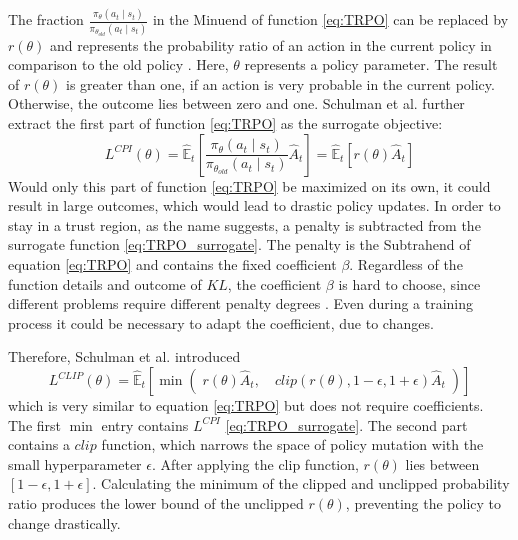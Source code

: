 The fraction $\frac{\pi_{\theta}(a_{t} \mid s_{t})}{\pi_{\theta_{old}}(a_{t} \mid s_{t})}$ in the Minuend of function \eqref{eq:TRPO} can be replaced by $r(\theta)$
and represents the probability ratio of an action in the current policy in comparison to the old policy \cite{scwo17}. Here, $\theta$ represents a policy parameter. The result of $r(\theta)$ is greater than one, if an action is very probable in the current policy. Otherwise, the outcome lies between zero and one. Schulman et al. \cite{scwo17} further extract the first part of function \eqref{eq:TRPO} as the surrogate objective:
\begin{equation}\label{eq:TRPO_surrogate}
    L^{CPI}(\theta) = \hat{\mathbb{E}}_{t} \left[ \frac{\pi_{\theta}(a_{t} \mid s_{t})}{\pi_{\theta_{old}}(a_{t} \mid s_{t})} \hat{A}_{t} \right]
    = \hat{\mathbb{E}}_{t} \left[ r(\theta)\hat{A}_{t} \right]
\end{equation}
Would only this part of function \eqref{eq:TRPO} be maximized on its own, it could result in large outcomes, which would lead to drastic policy updates. In order to stay in a trust region, as the name suggests, a penalty is subtracted from the surrogate function \eqref{eq:TRPO_surrogate}. The penalty is the Subtrahend of equation \eqref{eq:TRPO} and contains the fixed coefficient $\beta$. Regardless of the function details and outcome of $KL$, the coefficient $\beta$ is hard to choose, since different problems require different penalty degrees \cite{scwo17}. Even during a training process it could be necessary to adapt the coefficient, due to changes.

Therefore, Schulman et al. introduced
\begin{equation}\label{eq:PPO}
    L^{CLIP}(\theta) = \hat{\mathbb{E}}_{t} \left[ \min \left( \; r(\theta)\hat{A}_{t}, \quad clip(r(\theta), 1-\epsilon, 1+\epsilon)\hat{A}_{t} \; \right) \right]
\end{equation}
which is very similar to equation \eqref{eq:TRPO} but does not require coefficients. The first $\min$ entry contains $L^{CPI}$ \eqref{eq:TRPO_surrogate}. The second part contains a $clip$ function, which narrows the space of policy mutation with the small hyperparameter $\epsilon$. After applying the clip function, $r(\theta)$ lies between $[1-\epsilon,1+\epsilon]$. Calculating the minimum of the clipped and unclipped probability ratio produces the lower bound of the unclipped $r(\theta)$, preventing the policy to change drastically.

